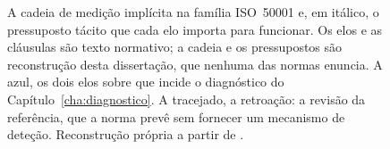 \begin{figure}[H]
  \caption[A cadeia de medição normativa e os seus pressupostos tácitos]{A
   cadeia de medição implícita na família ISO~50001 e, em itálico, o
   pressuposto tácito que cada elo importa para funcionar. Os elos e as
   cláusulas são texto normativo; a cadeia e os pressupostos são reconstrução
   desta dissertação, que nenhuma das normas enuncia. A azul, os dois elos
   sobre que incide o diagnóstico do Capítulo~\ref{cha:diagnostico}. A
   tracejado, a retroação: a revisão da referência, que a norma prevê sem
   fornecer um mecanismo de deteção. Reconstrução própria a partir de
   \cite{ISO50001_2018,ISO50006_2014,ISO50015_2014}.}
  \label{fig:cadeia-normativa}
\end{figure}
